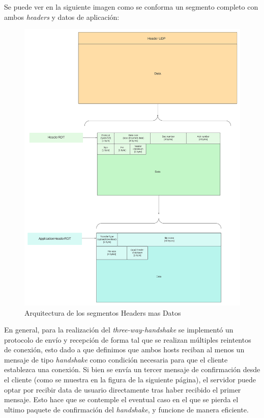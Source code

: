 \documentclass[11pt,a4paper]{article}
\begin{document}
Se puede ver en la siguiente imagen como se conforma un segmento completo con ambos \textit{headers} y datos de aplicación:

\begin{figure}[H]
    \centering
    \begin{center}
    \includegraphics[width=16cm]
    {images/implementacion/Segments_Architecture.png}
    \end{center}
    \caption{Arquitectura de los segmentos Headers mas Datos}
\end{figure}

\newpage

En general, para la realización del \textit{three-way-handshake} se implementó un protocolo de envío y recepción de forma tal que se realizan múltiples reintentos de conexión, esto dado a que definimos que ambos hosts reciban al menos un mensaje de tipo \textit{handshake} como condición necesaria para que el cliente establezca una conexión. Si bien se envía un tercer mensaje de confirmación desde el cliente (como se muestra en la figura de la siguiente página), el servidor puede optar por recibir data de usuario directamente tras haber recibido el primer mensaje. Esto hace que se contemple el eventual caso en el que se pierda el ultimo paquete de confirmación del \textit{handshake}, y funcione de manera eficiente.
\end{document}
